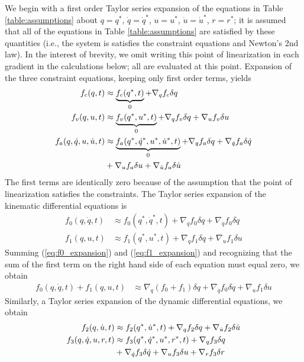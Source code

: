 We begin with a first order Taylor series expansion of the equations in Table
\ref{table:assumptions} about $q=q^*$, $\dot{q}=\dot{q}^*$, $u=u^*$,
$\dot{u}=\dot{u}^*$, $r=r^*$; it is assumed that all of the equations in Table
\ref{table:assumptions} are satisfied by these quantities (i.e., the system is
satisfies the constraint equations and Newton's 2nd law).  In the interest of
brevity, we omit writing this point of linearization in each gradient in the
calculations below; all are evaluated at this point. Expansion of the three
constraint equations, keeping only first order terms, yields
\begin{align}
  \label{eq:configuration_expansion}
  f_{c}(q, t) &\approx \underbrace{f_{c}(q^*, t)}_{0} +
  \nabla_{q}f_{c} \delta q\\
  \label{eq:velocity_expansion}
  f_{v}(q, u, t) &\approx \underbrace{f_{v}(q^*,
  u^*, t)}_{0} +  \nabla_{q}f_{v} \delta q +
  \nabla_{u}f_{v} \delta u \\
  \label{eq:acceleration_expansion}
  f_{a}(q, \dot{q}, u, \dot{u}, t) &\approx
  \underbrace{f_{a}(q^*, \dot{q}^*, u^*, \dot{u}^*,
t)}_{0} +  \nabla_{q}f_{a} \delta q +
\nabla_{\dot{q}}f_{a}
 \delta \dot{q} \notag\\
&+ \nabla_{u}f_{a} \delta u + \nabla_{\dot{u}}f_{a}
\delta \dot{u}
\end{align}
The first terms are identically zero because of the assumption that the
point of linearization satisfies the constraints.  The Taylor series expansion
of the kinematic differential equations is
\begin{align}
  \label{eq:f0_expansion}
  f_{0}(q, \dot{q}, t) &\approx f_{0}(q^*,
  \dot{q}^*, t) + \nabla_{q}f_{0} \delta{q} +
  \nabla_{\dot{q}}f_{0} \delta\dot{q}\\
  \label{eq:f1_expansion}
  f_{1}(q, u, t) &\approx f_{1}(q^*,
  u^*, t) + \nabla_{q}f_{1} \delta{q} +
  \nabla_{u}f_{1} \delta{u}
\end{align}
Summing (\ref{eq:f0_expansion}) and (\ref{eq:f1_expansion}) and recognizing
that the sum of the first term on the right hand side of each equation must
equal zero, we obtain
\begin{align}
  \label{eq:f0_plus_f1_expansion}
  f_{0}(q, \dot{q}, t) + f_{1}(q, u, t) &\approx
  \nabla_{q}(f_{0} + f_{1}) \delta{q} +
  \nabla_{\dot{q}}f_{0} \delta\dot{q} +
  \nabla_{u}f_{1} \delta{u}
\end{align}
Similarly, a Taylor series expansion of the dynamic differential equations, we
obtain
\begin{align}
  \label{eq:f2_expansion}
  f_{2}(q, \dot{u}, t) &\approx
      f_{2}(q^*, \dot{u}^*, t) +
      \nabla_{q}f_{2} \delta{q}
      + \nabla_{\dot{u}}f_{2} \delta\dot{u}\\
  f_{3}(q, \dot{q}, u, r, t) &\approx
  f_{3}(q^*, \dot{q}^*, u^*, r^*, t) +
  \nabla_{q}f_{3} \delta{q}\notag\\
  \label{eq:f3_expansion}
  &+ \nabla_{\dot{q}}f_{3} \delta\dot{q}
  + \nabla_{u}f_{3} \delta u
  + \nabla_{r}f_{3} \delta{r}
\end{align}
